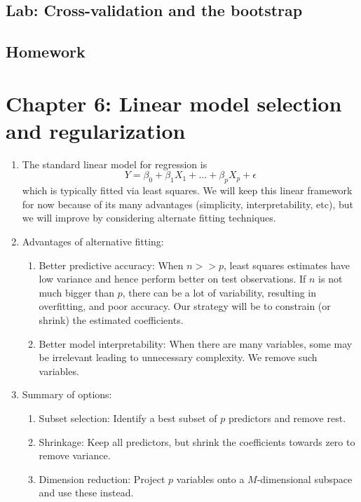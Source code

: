 \documentclass{article}
\begin{document}
\subsection*{Lab: Cross-validation and the bootstrap}

\subsection*{Homework}

\section*{Chapter 6: Linear model selection and regularization} 

\begin{enumerate}
\item The standard linear model for regression is
\[
Y = \beta_0 + \beta_1 X_1 + \dots + \beta_p X_p + \epsilon
\]
which is typically fitted via least squares. We will keep this linear framework for now because of its many advantages (simplicity, interpretability, etc), but we will improve by considering alternate fitting techniques.

\item Advantages of alternative fitting:
\begin{enumerate}
\item Better predictive accuracy: When $n >>p$, least squares estimates have low variance and hence perform better on test observations. If $n$ is not much bigger than $p$, there can be a lot of variability, resulting in overfitting, and poor accuracy. Our strategy will be to constrain (or shrink) the estimated coefficients. 

\item Better model interpretability: When there are many variables, some may be irrelevant leading to unnecessary complexity. We remove such variables.
\end{enumerate}

\item Summary of options:
\begin{enumerate}
\item Subset selection: Identify a best subset of $p$ predictors and remove rest.
\item Shrinkage: Keep all predictors, but shrink the coefficients towards zero to remove variance. 
\item Dimension reduction: Project $p$ variables onto a $M$-dimensional subspace and use these instead.
\end{enumerate}
\end{enumerate}
\end{document}
